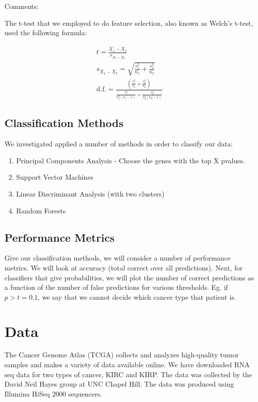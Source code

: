 Comments:

The t-test that we employed to do feature selection, also known as Welch's
t-test, used the following formula:

\begin{gather}
t = \frac{\overline{X}_1-\overline{X}_2}{s_{\overline{X}_1-\overline{X}_2}} \\
s_{\overline{X}_1-\overline{X}_2} = \sqrt{\frac{s_1^2}{n_1}+\frac{s_2^2}{n_2}} \\
\text{d.f.} = \frac{\left(\frac{s_1^2}{n_1}+\frac{s_2^2}{n_2} \right)}{\frac{s_1^4}{n_1^2(n_1-1)} + \frac{s_2^4}{n_2^2(n_2-1)}}
\end{gather}

\subsection{Classification Methods}

We investigated applied a number of methods in order to classify our data:

\begin{enumerate}
\item Principal Components Analysis - Choose the genes with the top X pvalues. 
\item Support Vector Machines
\item Linear Discriminant Analysis (with two clusters)
\item Random Forests
\end{enumerate}

\subsection{Performance Metrics}

Give our classification methods, we will consider a number of performance
metrics. We will look at accuracy (total correct over all predictions). Next,
for classifiers that give probabilities, we will plot the number of correct
predictions as a function of the number of false predictions for various
thresholds. Eg. if $p>t=0.1$, we say that we cannot decide which cancer type
that patient is. 

\section{Data}

The Cancer Genome Atlas (TCGA) collects and analyzes high-quality tumor samples
and makes a variety of data available online. We have downloaded RNA seq data
for two types of cancer, KIRC and KIRP. The data was collected by the David
Neil Hayes group at UNC Chapel Hill. The data was produced using Illumina HiSeq
2000 sequencers. 

